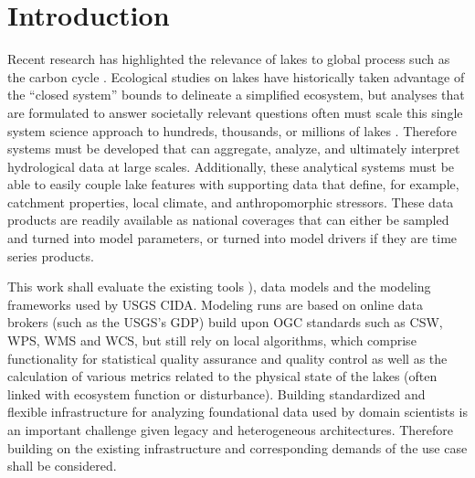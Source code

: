 

\chapter{Introduction}

	Recent research has highlighted the relevance of lakes to global process such as the carbon cycle \citep{cole2007plumbing}.
	Ecological studies on lakes have historically taken advantage of the “closed system” bounds to delineate a simplified ecosystem, but analyses that are formulated to answer societally relevant questions often must scale this single system science approach to hundreds, thousands, or millions of lakes \citep{downing2006global}.
	Therefore systems must be developed that can aggregate, analyze, and ultimately interpret hydrological data at large scales. Additionally, these analytical systems must be able to easily couple lake features with supporting data that define, for example, catchment properties, local climate, and anthropomorphic stressors.
	These data products are readily available as national coverages that can either be sampled and turned into model parameters, or turned into model drivers if they are time series products.

	This work shall evaluate the existing tools \citep[e.g. \la{}, see][]{read2011derivation}), data models and the modeling frameworks used by USGS CIDA.
	Modeling runs are based on online data brokers (such as the USGS’s \ac{GDP}) build upon \ac{OGC} standards such as \ac{CSW}, \ac{WPS}, \ac{WMS} and \ac{WCS}, but still rely on local algorithms, which comprise functionality for statistical quality assurance and quality control as well as the calculation of various metrics related to the physical state of the lakes (often linked with ecosystem function or disturbance). Building standardized and flexible infrastructure for analyzing foundational data used by domain scientists is an important challenge given legacy and heterogeneous architectures.
	Therefore building on the existing infrastructure and corresponding demands of the use case shall be considered.

